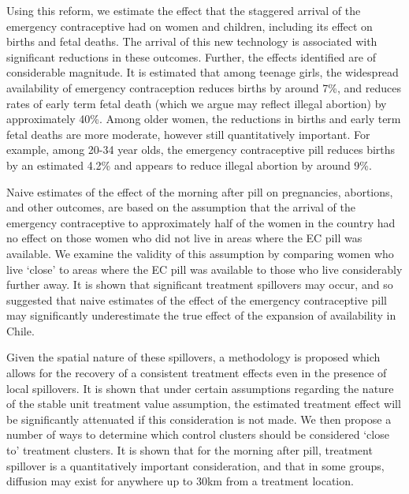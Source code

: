 Using this reform, we estimate the effect that the staggered arrival of the 
emergency contraceptive had on women and children, including its effect on births 
and fetal deaths. The arrival of this new technology is associated with significant 
reductions in these outcomes.  Further, the effects identified are of considerable
magnitude.  It is estimated that among teenage girls, the widespread availability 
of emergency contraception reduces births by around 7\%, and reduces rates of early
term fetal death (which we argue may reflect illegal abortion) by approximately 40\%. 
Among older women, the reductions in births and early term fetal deaths are more 
moderate, however still quantitatively important.  For example, among 20-34 year 
olds, the emergency contraceptive pill reduces births by an estimated 4.2\% and 
appears to reduce illegal abortion by around 9\%.

\nocite{Goldin2006, Bailey2011}
\nocite{KearnerLevine2009}
\nocite{Ananatetal2007,ThomasDouglas1996,Levineetal1996}

Naive estimates of the effect of the morning after pill on pregnancies, abortions, 
and other outcomes, are based on the assumption that the arrival of the emergency 
contraceptive to approximately half of the women in the country had no effect on 
those women who did not live in areas where the EC pill was available.  We examine 
the validity of this assumption by comparing women who live `close' to areas where 
the EC pill was available to those who live considerably further away.  It is shown 
that significant treatment spillovers may occur, and so suggested that naive 
estimates of the effect of the emergency contraceptive pill may significantly 
underestimate the true effect of the expansion of availability in Chile.

Given the spatial nature of these spillovers, a methodology is proposed which
allows for the recovery of a consistent treatment effects even in the presence
of local spillovers.  It is shown that under certain assumptions regarding the
nature of the stable unit treatment value assumption, the estimated treatment 
effect will be significantly attenuated if this consideration is not made.
We then propose a number of ways to determine which control clusters should
be considered `close to' treatment clusters.  It is shown that for the morning
after pill, treatment spillover is a quantitatively important consideration,
and that in some groups, diffusion may exist for anywhere up to 30km from a
treatment location.


